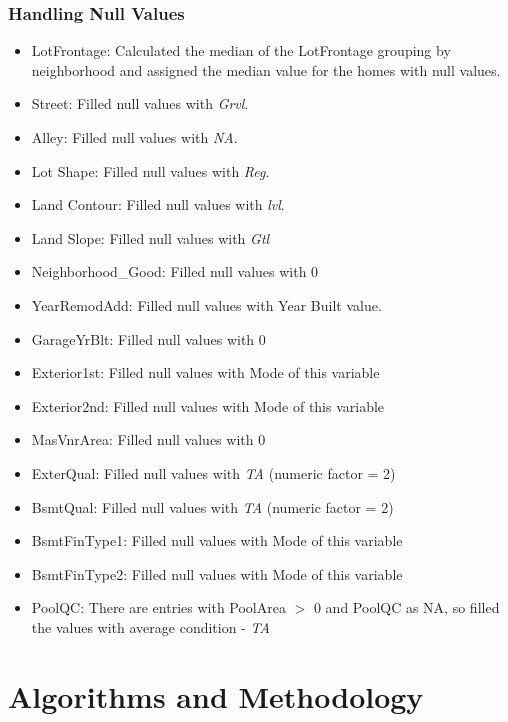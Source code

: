 \documentclass[sigconf]{acmart}
\begin{document}
	\subsubsection{Handling Null Values}
	\begin{itemize}
		\item  LotFrontage: Calculated the median of the LotFrontage grouping by neighborhood and assigned the median value for the homes with null values.
		\item  Street: Filled null values with {\em Grvl}. 
		\item  Alley: Filled null values with {\em NA}. 
		\item  Lot Shape: Filled null values with {\em Reg}. 
		\item  Land Contour: Filled null values with {\em lvl}. 
		\item  Land Slope: Filled null values with {\em Gtl} 
		\item  Neighborhood\_Good: Filled null values with 0
		\item  YearRemodAdd: Filled null values with Year Built value.
		\item  GarageYrBlt: Filled null values with 0
		\item  Exterior1st: Filled null values with Mode of this variable
		\item  Exterior2nd: Filled null values with Mode of this variable
		\item  MasVnrArea: Filled null values with 0
		\item  ExterQual: Filled null values with {\em TA} (numeric factor = 2)
		\item  BsmtQual: Filled null values with {\em TA} (numeric factor = 2)
		\item  BsmtFinType1: Filled null values with Mode of this variable
		\item  BsmtFinType2: Filled null values with Mode of this variable
		\item  PoolQC: There are entries with PoolArea $>$ 0 and PoolQC as NA, so filled the values with average condition - {\em TA}
	\end{itemize}
	
	\section{Algorithms and Methodology}
	
\end{document}
